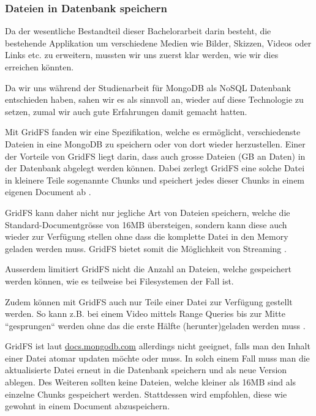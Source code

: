 \subsubsection{Dateien in Datenbank speichern}
\label{seq:save_file_in_db}
Da der wesentliche Bestandteil dieser Bachelorarbeit darin besteht, die bestehende Applikation um verschiedene Medien wie Bilder, Skizzen, Videos oder Links etc. zu erweitern, mussten wir uns zuerst klar werden, wie wir dies erreichen könnten.

Da wir uns während der Studienarbeit \cite{methode635-sa} für MongoDB als NoSQL Datenbank entschieden haben, sahen wir es als sinnvoll an, wieder auf diese Technologie zu setzen, zumal wir auch gute Erfahrungen damit gemacht hatten.

Mit GridFS \cite{gridfs-mongodb}\cite{gridfs-mongodb-async-driver} fanden wir eine Spezifikation, welche es ermöglicht, verschiedenste Dateien in eine MongoDB zu speichern oder von dort wieder herzustellen. Einer der Vorteile von GridFS liegt darin, dass auch grosse Dateien (GB an Daten) in der Datenbank abgelegt werden können. Dabei zerlegt GridFS eine solche Datei in kleinere Teile sogenannte Chunks und speichert jedes dieser Chunks in einem eigenen Document ab \cite{gridfs-mongodb}.

GridFS kann daher nicht nur jegliche Art von Dateien speichern, welche die Standard-Documentgrösse von 16MB übersteigen, sondern kann diese auch wieder zur Verfügung stellen ohne dass die komplette Datei in den Memory geladen werden muss. GridFS bietet somit die Möglichkeit von Streaming \cite{gridfs-chunking}.

Ausserdem limitiert GridFS nicht die Anzahl an Dateien, welche gespeichert werden können, wie es teilweise bei Filesystemen der Fall ist.

Zudem können mit GridFS auch nur Teile einer Datei zur Verfügung gestellt werden. So kann z.B. bei einem Video mittels Range Queries bis zur Mitte ``gesprungen`` werden ohne das die erste Hälfte (herunter)geladen werden muss \cite{gridfs-mongodb}.

GridFS ist laut \href{https://docs.mongodb.com/manual/core/gridfs/}{docs.mongodb.com} allerdings nicht geeignet, falls man den Inhalt einer Datei atomar updaten möchte oder muss. In solch einem Fall muss man die aktualisierte Datei erneut in die Datenbank speichern und als neue Version ablegen. Des Weiteren sollten keine Dateien, welche kleiner als 16MB sind als einzelne Chunks gespeichert werden. Stattdessen wird empfohlen, diese wie gewohnt in einem Document abzuspeichern.

